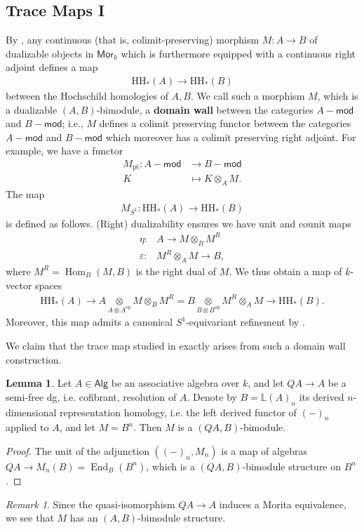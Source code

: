 \documentclass{article}
\numberwithin{equation}{section}
\theoremstyle{quest}
\theoremstyle{definition}
\newtheorem{lem}[thm]{Lemma}
\theoremstyle{remark}
\newtheorem{rmk}[thm]{Remark}
\newcommand{\msf}{\mathsf}
\newcommand{\Mod}{-\msf{mod}}
\DeclareMathOperator{\Hom}{Hom}
\DeclareMathOperator{\End}{End}
\DeclareMathOperator{\pt}{pt}
\begin{document}
	\subsection{Trace Maps I}\label{sec:trace-maps-I}
	By \cite[Section 3.4]{nonlinear-trace}, any continuous (that is, colimit-preserving) morphism $M:A\to B$ of dualizable objects in $\mathsf{Mor}_k$ which is furthermore equipped with a continuous right adjoint defines a map
\begin{align*}
	\mathrm H\mathrm H_*(A)\to \mathrm H\mathrm H_*(B)
\end{align*} 
between the Hochschild homologies of $A,B$. We call such a morphism $M$, which is a dualizable $(A,B)$-bimodule, a \textbf{domain wall} between the categories $A \Mod$ and $B\Mod$; i.e., $M$ defines a colimit preserving functor between the categories $A \Mod$ and $B\Mod$ which moreover has a colimit preserving right adjoint. For example, we have a functor
\begin{align*}
	M_{\pt}: A\Mod&\to B\Mod\\
	K&\mapsto K\otimes _A M.
\end{align*} 
The map
\begin{align*}
	M_{S^1}:\mathrm H\mathrm H_*(A)\to \mathrm H\mathrm H_*(B)
\end{align*} 
is defined as follows. (Right) dualizability ensures we have unit and counit maps
\begin{align*}
	\eta:&A\to M\otimes _BM^R\\
	\varepsilon:&M^R\otimes _AM\to B,
\end{align*} 
where $M^R=\Hom_B(M,B)$ is the right dual of $M$. We thus obtain a map of $k$-vector spaces
\begin{align}\label{eq:HH-map}
	\mathrm H\mathrm H_*(A)\to A\underset{A\otimes A^{\text{op}}}{\otimes }M\otimes _BM^R=B\underset{B\otimes B^{\text{op}}}{\otimes }M^R\otimes _AM\to \mathrm H\mathrm H_*(B).
\end{align} 
Moreover, this map admits a canonical $S^1$-equivariant refinement by \cite[Theorem 2.14]{HSS}.

We claim that the trace map studied in \cite{BKR} exactly arises from such a domain wall construction.

\begin{lem}\label{lem:A-module-structure}
	Let $A\in \mathsf{Alg}$ be an associative algebra over $k$, and let $QA\to A$ be a semi-free dg, i.e. cofibrant, resolution of $A$. Denote by $B=\mathbb{L}(A)_n$ its derived $n$-dimensional representation homology, i.e. the left derived functor of $(-)_n$ applied to $A$, and let $M=B^n$. Then $M$ is a $(QA,B )$-bimodule.
\end{lem} 
\begin{proof}
	The unit of the adjunction $((-)_n,M_n)$ is a map of algebras $QA\to M_n(B) = \End_B(B^n)$, which is a $(QA,B)$-bimodule structure on $B^n$.
\end{proof} 
\begin{rmk}
	 Since the quasi-isomorphism $QA\to A$ induces a Morita equivalence, we see that $M$ has an $(A,B)$-bimodule structure.
\end{rmk} 
 
\end{document}
